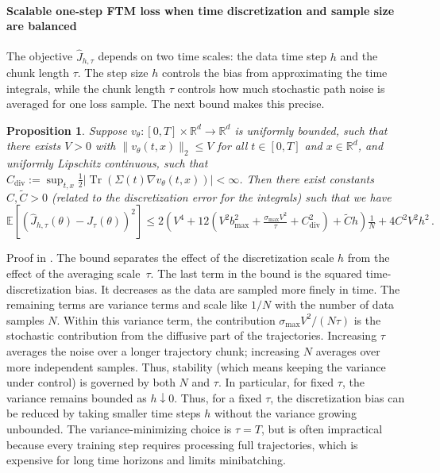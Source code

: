 \documentclass[oneside,11pt]{article}
\newtheorem{proposition}{Proposition}
\theoremstyle{remark}
\DeclareMathOperator{\Tr}{Tr}
\begin{document}
\paragraph{Scalable one-step FTM loss when time discretization and sample size are balanced}
The objective $\widehat{J}_{h,\tau}$ depends on two time scales: the data time step $h$ and the chunk length $\tau$. The step size $h$ controls the bias from approximating the time integrals, while the chunk length $\tau$ controls how much stochastic path noise is averaged for one loss sample.  
The next bound makes this precise.
\begin{proposition} \label{prop:msebound}
Suppose $v_\theta \colon [0,T] \times \mathbb{R}^d \to \mathbb{R}^d$ is uniformly bounded, such that there exists $V > 0$ with $\lVert v_\theta(t,x) \rVert_2 \leq V$ for all $t \in [0,T]$ and $x \in \mathbb{R}^d$, and uniformly Lipschitz continuous, such that $C_{\text{div}}:= \sup_{t,x} \tfrac12 \lvert \Tr \left(\Sigma(t) \nabla v_\theta(t,x) \right) \rvert < \infty$. Then there exist constants $C, \tilde{C} > 0$ (related to the discretization error for the integrals) such that we have
\begin{equation}\label{eq:MSEBound}
\mathbb{E}\left[(\widehat{J}_{h,\tau}(\theta) - J_\tau(\theta))^2\right] \leq 2 \left(V^4 + 12 \left( V^2 b_{\max}^2 + \tfrac{\sigma_{\max} V^2}{\tau} + C_{\text{div}}^2 \right) + \tilde{C} h \right) \tfrac{1}{N}  + 4 C^2 V^2 h^2\,.
\end{equation}
\end{proposition}

Proof in . The bound separates the effect of the discretization scale $h$ from the effect of the averaging scale~$\tau$. 
The last term in the bound is the squared time-discretization bias. It decreases as the data are sampled more finely in time. 
The remaining terms are variance terms and scale like $1/N$ with the number of data samples $N$. Within this variance term, the contribution $\sigma_{\text{max}}V^2/(N\tau)$ is the stochastic contribution from the diffusive part of the trajectories. Increasing $\tau$ averages the noise over a longer trajectory chunk; increasing $N$ averages over more independent samples. Thus, stability (which means keeping the variance under control) is governed by both $N$ and $\tau$.
In particular, for fixed $\tau$, the variance remains bounded as $h \downarrow 0$. Thus, for a fixed $\tau$, the discretization bias can be reduced by taking smaller time steps $h$ without the variance growing unbounded. 
The variance-minimizing choice is $\tau = T$, but is often impractical because every training step requires
processing full trajectories, which is expensive for long time horizons and
limits minibatching.
\end{document}
